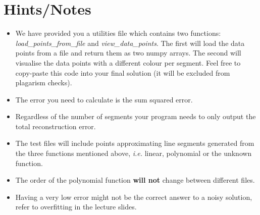 \documentclass[10pt]{article}
\begin{document}
\section{Hints/Notes}
\label{sec:hints/notes}
\begin{itemize}
    \item We have provided you a utilities file which contains two functions: \textit{load\_points\_from\_file} and \textit{view\_data\_points}.
        The first will load the data points from a file and return them as two numpy arrays.
        The second will visualise the data points with a different colour per segment.
        Feel free to copy-paste this code into your final solution (it will be excluded from plagarism checks).
    \item The error you need to calculate is the sum squared error. 
    \item Regardless of the number of segments your program needs to only output the total reconstruction error. 
    \item The test files will include points approximating line segments generated from the three functions mentioned above, \textit{i.e.} linear, polynomial or the unknown function. 
    \item The order of the polynomial function \textbf{will not} change between different files.
    \item Having a very low error might not be the correct answer to a noisy solution, refer to overfitting in the lecture slides. 
\end{itemize}
\end{document}
